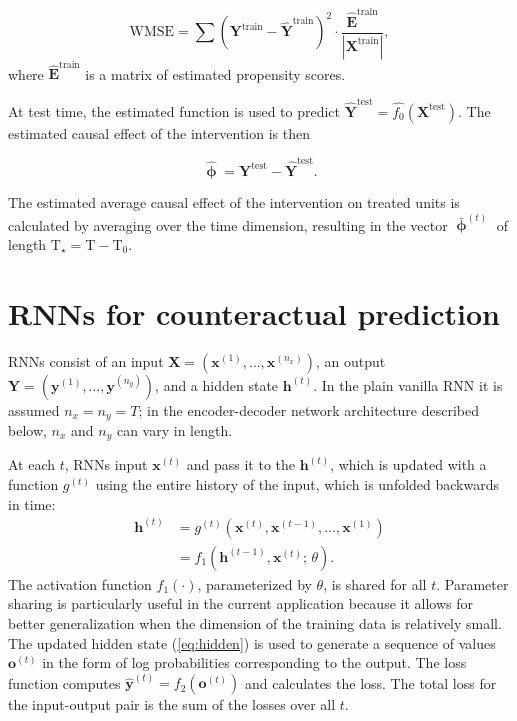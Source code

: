 \begin{equation} \label{eq:mse}
	\text{WMSE} = \sum \left(\boldsymbol{Y}^{\text{train}} - \boldsymbol{\hat{Y}}^{\text{train}}  \right)^2  \cdot \frac{\boldsymbol{\hat{E}}^\text{train}}{|\boldsymbol{X}^\text{train}|},
\end{equation}
\noindent
where $\boldsymbol{\hat{E}}^\text{train}$ is a matrix of estimated propensity scores. 

At test time, the estimated function is used to predict $\boldsymbol{\hat{Y}}^{\text{test}} = \hat{f_0} \left(\boldsymbol{X}^{\text{test}}\right)$. The estimated causal effect of the intervention is then

\begin{equation}\label{eq:pointwise}
	\boldsymbol{\hat{\upphi}} = \boldsymbol{Y}^{\text{test}} - \boldsymbol{\hat{Y}}^{\text{test}}. 
\end{equation}

The estimated average causal effect of the intervention on treated units is calculated by averaging over the time dimension, resulting in the vector $\boldsymbol{\bar{\upphi}}^{(t)}$ of length $\text{T}_\star = \text{T}-\text{T}_0$. 

\section{RNNs for counteractual prediction} \label{RNNs-section}

RNNs \citep{graves2012,goodfellow2016deep} consist of an input $\boldsymbol{X} = \left(\boldsymbol{x}^{(1)}, \ldots, \boldsymbol{x}^{(n_x)}\right)$, an output $\boldsymbol{Y} = \left(\boldsymbol{y}^{(1)}, \ldots, \boldsymbol{y}^{(n_y)}\right)$, and a hidden state $\boldsymbol{h}^{(t)}$. In the plain vanilla RNN it is assumed $n_x = n_y = T$; in the encoder-decoder network architecture described below, $n_x$ and $n_y$ can vary in length. 

At each $t$, RNNs input $\boldsymbol{x}^{(t)}$ and pass it to the $\boldsymbol{h}^{(t)}$, which is updated with a function $g^{(t)}$ using the entire history of the input, which is unfolded backwards in time:
%
\begin{align}
	\boldsymbol{h}^{(t)} &= g^{(t)} \left(\boldsymbol{x}^{(t)}, \boldsymbol{x}^{(t-1)}, \ldots, \boldsymbol{x}^{(1)} \right) \\ 
	&= f_1 \left( \boldsymbol{h}^{(t-1)}, \boldsymbol{x}^{(t)}; \, \theta \right). \label{eq:hidden}
\end{align} 
The activation function $f_1 (\cdot)$, parameterized by $\theta$, is shared for all $t$. Parameter sharing is particularly useful in the current application because it allows for better generalization when the dimension of the training data is relatively small. The updated hidden state (\ref{eq:hidden}) is used to generate a sequence of values $\boldsymbol{o}^{(t)}$ in the form of log probabilities corresponding to the output. The loss function computes $\boldsymbol{\hat{y}}^{(t)} = f_2 \left(\boldsymbol{o}^{(t)}\right)$ and calculates the loss. The total loss for the input-output pair is the sum of the losses over all $t$.


